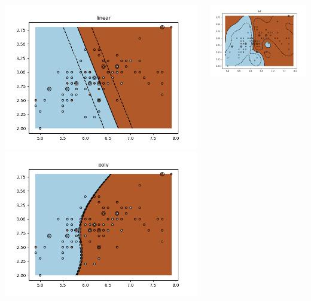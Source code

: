 \documentclass{beamer}
\begin{document}
	\begin{frame}
		\begin{columns}
			\begin{column}{0.5\textwidth}
				\includegraphics[width=1\textwidth]{img/svm_kernels_1}
				\includegraphics[width=1\textwidth]{img/svm_kernels_2}
			\end{column}
			\begin{column}[t]{0.5\textwidth}
				\includegraphics[width=1\textwidth]{img/svm_kernels_3}

\end{column}
\end{columns}
\end{frame}
\end{document}
